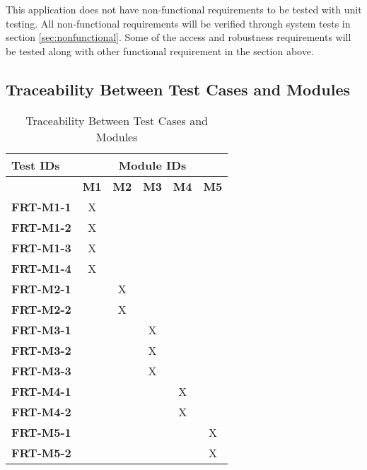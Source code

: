 \documentclass[12pt, titlepage]{article}
\begin{document}
This application does not have non-functional requirements to be tested with unit testing. All non-functional requirements will be verified through system tests in section \ref{sec:nonfunctional}. Some of the access and robustness requirements will be tested along with other functional requirement in the section above.

\subsection{Traceability Between Test Cases and Modules}

\begin{longtable}{|l|ccccc|}
	\caption{Traceability Between Test Cases and Modules}                                                                                             \\
	\hline
	\textbf{Test IDs}  & \multicolumn{5}{c|}{\textbf{Module IDs}}                                                                                     \\
	\hline
	~                  & \textbf{M1}                              & \textbf{M2} & \textbf{M3} & \textbf{M4} & \textbf{M5} \\
	\hline
	\textbf{FRT-M1-1}  & X                                        & ~           & ~           & ~           & ~ \\
	\textbf{FRT-M1-2}  & X                                        & ~           & ~           & ~           & ~ \\
	\textbf{FRT-M1-3}  & X                                        & ~           & ~           & ~           & ~ \\
	\textbf{FRT-M1-4}  & X                                        & ~           & ~           & ~           & ~ \\
	\textbf{FRT-M2-1}  & ~                                        & X           & ~           & ~           & ~ \\
	\textbf{FRT-M2-2}  & ~                                        & X           & ~           & ~           & ~ \\
	\textbf{FRT-M3-1}  & ~                                        & ~           & X           & ~           & ~ \\
	\textbf{FRT-M3-2}  & ~                                        & ~           & X           & ~           & ~ \\
	\textbf{FRT-M3-3}  & ~                                        & ~           & X           & ~           & ~ \\
  \textbf{FRT-M4-1}  & ~                                        & ~           & ~           & X           & ~ \\
	\textbf{FRT-M4-2}  & ~                                        & ~           & ~           & X           & ~ \\
	\textbf{FRT-M5-1}  & ~                                        & ~           & ~           & ~           & X \\
	\textbf{FRT-M5-2}  & ~                                        & ~           & ~           & ~           & X \\
	\hline
\end{longtable}
				
\end{document}
